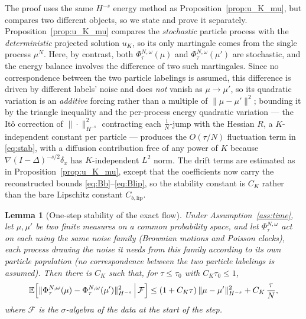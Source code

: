 \documentclass[a4paper,fleqn]{cas-sc}
\newtheorem{lemma}[theorem]{Lemma}
\theoremstyle{definition}
\theoremstyle{remark}
\begin{document}
The proof uses the same $H^{-s}$ energy method as
Proposition~\ref{prop:u_K_mu}, but compares two different objects, so we state and
prove it separately. Proposition~\ref{prop:u_K_mu} compares the \emph{stochastic}
particle process with the \emph{deterministic} projected solution $u_K$, so its
only martingale comes from the single process $\mu^N$. Here, by contrast, both
$\Phi^{N,\omega}_\tau(\mu)$ and $\Phi^{N,\omega}_\tau(\mu')$ are stochastic, and
the energy balance involves the difference of two such martingales. Since no
correspondence between the two particle labelings is assumed, this difference is
driven by different labels' noise and does \emph{not} vanish as $\mu\to\mu'$, so
its quadratic variation is an \emph{additive} forcing rather than a multiple of
$\|\mu-\mu'\|^2$; bounding it by the triangle inequality and the per-process energy
quadratic variation --- the It\^o correction of $\|\cdot\|_{H^{-s}}^2$ contracting
each $\tfrac1N$-jump with the Hessian $R$, a $K$-independent constant per particle
--- produces the $O(\tau/N)$ fluctuation term in \eqref{eq:stab}, with a diffusion
contribution free of any power of $K$ because $\nabla(I-\Delta)^{-s/2}\delta_x$ has
$K$-independent $L^2$ norm. The drift terms are estimated as in Proposition~\ref{prop:u_K_mu},
except that the coefficients now carry the reconstructed bounds
\eqref{eq:Bb}--\eqref{eq:Blip}, so the stability constant is $C_K$ rather than
the bare Lipschitz constant $C_{b,\mathrm{lip}}$.

\begin{lemma}[One-step stability of the exact flow]\label{lem:stability}
Under Assumption~\ref{ass:time}, let $\mu,\mu'$ be two finite measures on a common
probability space, and let $\Phi^{N,\omega}_\tau$ act on each using the same noise
family (Brownian motions and Poisson clocks), each process drawing the noise it
needs from this family according to its own particle population (no
correspondence between the two particle labelings is assumed). Then there is $C_K$
such that, for $\tau\le\tau_0$ with $C_K\tau_0\le1$,
\begin{equation}\label{eq:stab}
\mathbb E\Bigl[\|\Phi^{N,\omega}_\tau(\mu)-\Phi^{N,\omega}_\tau(\mu')\|_{H^{-s}}^2
\,\Big|\,\mathcal F\Bigr]
\le(1+C_K\tau)\,\|\mu-\mu'\|_{H^{-s}}^2+C_K\,\frac{\tau}{N},
\end{equation}
where $\mathcal F$ is the $\sigma$-algebra of the data at the start of the step.
\end{lemma}
\end{document}
